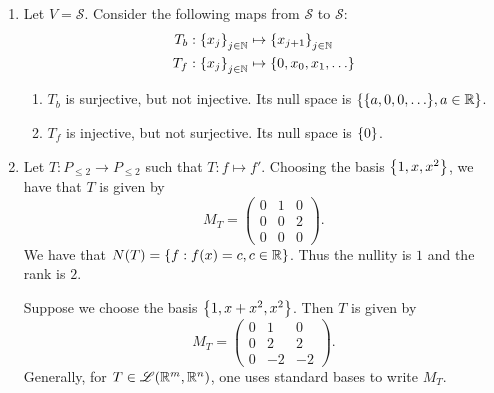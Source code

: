 \begin{example} \leavevmode
    \begin{enumerate}[label=(\alph*)]
        \item Let $V = \mathscr{S}$. Consider the following maps from $\mathscr{S}$ to $\mathscr{S}$:
            \begin{align*}
                T_{b} : \set{x_{j}}_{j \in \N} &\mapsto \set{x_{j+1}}_{j \in \N} \\
                T_{f} : \set{x_{j}}_{j \in \N} &\mapsto \set{0, x_{0}, x_{1}, \dots}
            \end{align*}
            \begin{enumerate}[label=(\roman*)]
                \item $T_{b}$ is surjective, but not injective. Its null space is $\set{\set{a, 0, 0, \dots}, a \in \R}$.
                \item $T_{f}$ is injective, but not surjective. Its null space is $\set{0}$.
            \end{enumerate}
        \item Let $T : P_{\leq 2} \to P_{\leq 2}$ such that $T : f \mapsto f'$.
        Choosing the basis $\set{1, x, x^{2}}$, we have that $T$ is given by \[
            M_{T} = \begin{pmatrix}
                0 & 1 & 0 \\
                0 & 0 & 2 \\
                0 & 0 & 0
            \end{pmatrix}.
        \] We have that $N(T) = \set{f : f(x) = c, c \in \R}$.
        Thus the nullity is $1$ and the rank is $2$.

        Suppose we choose the basis $\set{1, x + x^{2}, x^{2}}$. Then $T$ is given by \[
            M_{T} = \begin{pmatrix}
                0 & 1 & 0 \\
                0 & 2 & 2 \\
                0 & -2 & -2
            \end{pmatrix}.
        \] Generally, for $T \in \mathscr{L}(\mathbb{R}^{m}, \mathbb{R}^{n})$, one uses standard bases to write $M_{T}$.
    \end{enumerate}
\end{example}
